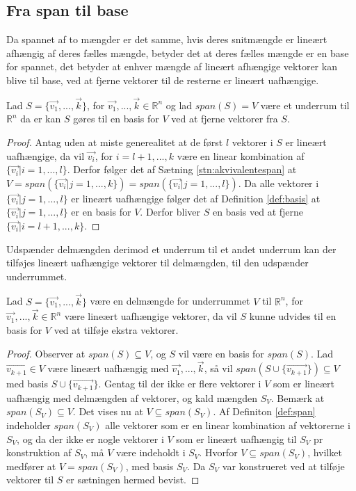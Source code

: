 \subsection{Fra span til base}
Da spannet af to mængder er det samme, hvis deres snitmængde er lineært afhængig af deres fælles mængde, betyder det at deres fælles mængde er en base for spannet, det betyder at enhver mængde af lineært afhængige vektorer kan blive til base, ved at fjerne vektorer til de resterne er lineært uafhængige.
\begin{stn}
Lad $S=\{\vec{v_1}, ..., \vec{k}\}$, for $\vec{v_1}, ..., \vec{k} \in \mathds{R}^n$ og lad $span(S) = V$ være et underrum til $\mathds{R}^n$ da er kan $S$ gøres til en basis for $V$ ved at fjerne vektorer fra $S$.
\label{stn:reduceringbasis}
\end{stn}
\begin{proof}
Antag uden at miste generealitet at de først $l$ vektorer i $S$ er  lineært uafhængige, da vil $\vec{v_i}$, for $i = l+1,...,k$ være en linear kombination af $\{\vec{v_i} | i = 1,...,l\}$. 
Derfor følger det af Sætning \ref{stn:akvivalentespan} at $V = span(\{\vec{v_i}| j =1,...,k\}) =span(\{\vec{v_i}| j=1,...,l\})$.
Da alle vektorer i $\{\vec{v_i}| j=1,...,l\}$ er lineært uafhængige følger det af Definition \ref{def:basis} at $\{\vec{v_i}| j=1,...,l\}$ er en basis for $V$. 
Derfor bliver $S$ en basis ved at fjerne $\{\vec{v_i}| i = l+1,...,k\}$.
\end{proof}
Udspænder delmængden derimod et underrum til et andet underrum kan der tilføjes lineært uafhængige vektorer til delmængden, til den udspænder underrummet.
\begin{stn}
Lad $S=\{\vec{v_1}, ..., \vec{k}\}$ være en delmængde for underrummet $V$ til $\mathds{R}^n$, for $\vec{v_1}, ..., \vec{k} \in \mathds{R}^n$ være lineært uafhængige vektorer, da vil $S$ kunne udvides til en basis for $V$ ved at tilføje ekstra vektorer.
\end{stn}
\begin{proof}
Observer at $span(S) \subseteq V$, og $S$ vil være en basis for $span(S)$.
Lad $\vec{v_{k+1}} \in V$ være lineært uafhængig med $\vec{v_1}, ..., \vec{k}$, så vil $span(S\cup\{\vec{v_{k+1}}\}) \subseteq V$ med basis $S\cup\{\vec{v_{k+1}}\}$. 
Gentag til der ikke er flere vektorer i $V$ som er lineært uafhængig med delmængden af vektorer, og kald mængden $S_V$.
Bemærk at $span(S_V) \subseteq V$.
Det vises nu at $V \subseteq span(S_V)$. 
Af Definiton \ref{def:span} indeholder $span(S_V)$ alle vektorer som er en linear kombination af vektorerne i $S_V$, og da der ikke er nogle vektorer i $V$ som er lineært uafhængig til $S_V$ pr konstruktion af $S_V$, må $V$ være indeholdt i $S_V$. 
Hvorfor $V \subseteq span(S_V)$, hvilket medfører at $V = span(S_V)$, med basis $S_V$. 
Da $S_V$ var konstrueret ved at tilføje vektorer til $S$ er sætningen hermed bevist.
\end{proof}





